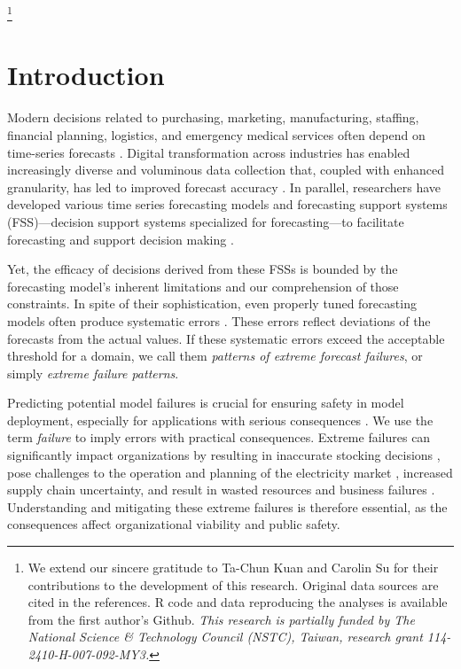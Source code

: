 \documentclass[]{interact}
\theoremstyle{plain}
\theoremstyle{definition}
\theoremstyle{remark}
\begin{document}
\thanks{We extend our sincere gratitude to Ta-Chun Kuan and Carolin Su for their
contributions to the development of this research. Original data sources are cited in the
references. R code and data reproducing the analyses is available from the first author's
Github. \textit{This research is partially funded by The National Science \& Technology
Council (NSTC), Taiwan, research grant 114-2410-H-007-092-MY3.}}

\section{Introduction}
\label{sec:Intro}

Modern decisions related to purchasing, marketing, manufacturing, staffing, financial
planning, logistics, and emergency medical services often depend on time-series forecasts
\citep{abreu2023}. Digital transformation across industries has enabled increasingly diverse
and voluminous data collection that, coupled with enhanced granularity, has led to improved
forecast accuracy \citep{chae2024}. In parallel, researchers have developed various time
series forecasting models and forecasting support systems (FSS)---decision support systems
specialized for forecasting---to facilitate forecasting and support decision making
\citep{petropoulos2022}.

Yet, the efficacy of decisions derived from these FSSs is bounded by the forecasting model's
inherent limitations and our comprehension of those constraints. In spite of their
sophistication, even properly tuned forecasting models often produce systematic errors
\citep{eyuboglu2022}. These errors reflect deviations of the forecasts from the actual
values. If these systematic errors exceed the acceptable threshold for a domain, we call them
\emph{patterns of extreme forecast failures}, or simply \emph{extreme failure patterns}.

Predicting potential model failures is crucial for ensuring safety in model deployment,
especially for applications with serious consequences \citep{tsiligkaridis2021}. We use the
term \emph{failure} to imply errors with practical consequences. Extreme failures can
significantly impact organizations by resulting in inaccurate stocking decisions
\citep{boylan2021}, pose challenges to the operation and planning of the electricity market
\citep{zhu2025}, increased supply chain uncertainty, and result in wasted resources and
business failures \citep{chae2024}. Understanding and mitigating these extreme failures is
therefore essential, as the consequences affect organizational viability and public safety.
\end{document}
